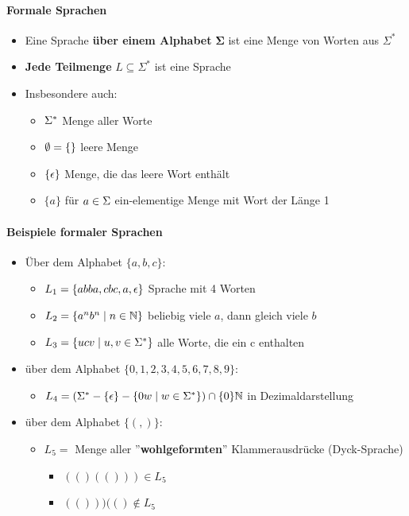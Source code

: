 \documentclass{scrartcl}
\begin{document}
\paragraph{Formale Sprachen}

\begin{itemize}
	\item Eine Sprache \textbf{über einem Alphabet} $\mathbf{\Sigma}$ ist eine Menge von Worten aus $\Sigma^*$
	\item \textbf{Jede Teilmenge} $L \subseteq \Sigma^*$ ist eine Sprache
	\item Insbesondere auch:
	\begin{itemize}
		\item $\Sigma^* \hfill$ Menge aller Worte
		\item $\emptyset = \{\} \hfill$ leere Menge
		\item $\{ \epsilon \} \hfill$ Menge, die das leere Wort enthält
		\item $\{ a \}$ für $a \in \Sigma \hfill$ ein-elementige Menge mit Wort der Länge 1
	\end{itemize}
\end{itemize}

\paragraph{Beispiele formaler Sprachen}

\begin{itemize}
	\item Über dem Alphabet $\{ a,b,c \}$:
	\begin{itemize}
		\item $L_1 = \{ abba, cbc, a, \epsilon \} \hfill$ Sprache mit 4 Worten
		\item $L_2 = \{ a^nb^n \mid n \in \mathbb{N} \} \hfill$ beliebig viele $a$, dann gleich viele $b$
		\item $L_3 = \{ ucv \mid u,v \in \Sigma^* \} \hfill$ alle Worte, die ein c enthalten
	\end{itemize}
	\item über dem Alphabet $\{ 0,1,2,3,4,5,6,7,8,9 \}$:
	\begin{itemize}
		\item $L_4 = (\Sigma^* - \{ \epsilon \} - \{ 0w \mid w \in \Sigma^* \}) \cap \{ 0 \} \hfill \mathbb{N}$ in Dezimaldarstellung
	\end{itemize}
	\item über dem Alphabet $\{ (,) \}$:
	\begin{itemize}
		\item $L_5 =$ Menge aller ''\textbf{wohlgeformten}'' Klammerausdrücke (Dyck-Sprache)
		\begin{itemize}
			\item $(()(())) \in L_5$
			\item $(()))(() \not \in L_5$
		\end{itemize}
	\end{itemize}
\end{itemize}
\end{document}
